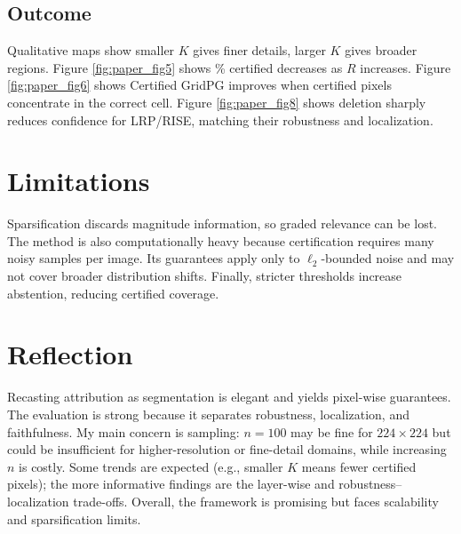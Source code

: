 \documentclass[11pt]{article}
\begin{document}
\subsection{Outcome}
Qualitative maps show smaller $K$ gives finer details, larger $K$ gives broader regions. Figure \ref{fig:paper_fig5} shows \% certified decreases as $R$ increases. Figure \ref{fig:paper_fig6} shows Certified GridPG improves when certified pixels concentrate in the correct cell. Figure \ref{fig:paper_fig8} shows deletion sharply reduces confidence for LRP/RISE, matching their robustness and localization.



\section{Limitations}
Sparsification discards magnitude information, so graded relevance can be lost. The method is also computationally heavy because certification requires many noisy samples per image. Its guarantees apply only to $\ell_2$-bounded noise and may not cover broader distribution shifts. Finally, stricter thresholds increase abstention, reducing certified coverage.

\section{Reflection}
Recasting attribution as segmentation is elegant and yields pixel-wise guarantees. The evaluation is strong because it separates robustness, localization, and faithfulness. My main concern is sampling: $n=100$ may be fine for $224\times224$ but could be insufficient for higher-resolution or fine-detail domains, while increasing $n$ is costly. Some trends are expected (e.g., smaller $K$ means fewer certified pixels); the more informative findings are the layer-wise and robustness--localization trade-offs. Overall, the framework is promising but faces scalability and sparsification limits.




\end{document}
